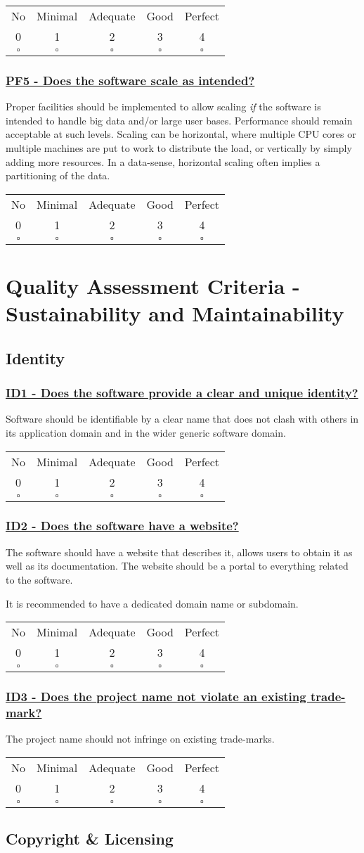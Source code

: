 \documentclass[a4paper,11pt]{article}
\newcommand{\criterion}[2]{\subsubsection*{\underline{#1 - #2}}\label{id:#1}}
\newcommand\CheckTable{%
  \begin{tabular}{ccccc}
    No & Minimal & Adequate & Good & Perfect \\
    0 & 1 & 2 & 3 & 4 \\
    \hline
    $\square$ & $\square$ & $\square$ & $\square$ & $\square$ \\
  \end{tabular}%
}
\begin{document}
\CheckTable

\newcommand{\pfFiveID}{PF5}
\newcommand{\pfFiveText}{Does the software scale as intended?}
\criterion{\pfFiveID}{\pfFiveText}

Proper facilities should be implemented to allow scaling \emph{if} the software is
intended to handle big data and/or large user bases. Performance should remain
acceptable at such levels.  Scaling can be horizontal, where multiple CPU cores
or multiple machines are put to work to distribute the load, or vertically by
simply adding more resources. In a data-sense, horizontal scaling often implies
a partitioning of the data.

\CheckTable

\section{Quality Assessment Criteria - Sustainability and Maintainability}\label{sec:sustAndMaint}

\subsection{Identity}\label{sec:ide}

\newcommand{\idOneID}{ID1}
\newcommand{\idOneText}{Does the software provide a clear and unique identity?}
\criterion{\idOneID}{\idOneText}

Software should be identifiable by a clear name that does not clash with others
in its application domain and in the wider generic software domain. 

\CheckTable

\newcommand{\idTwoID}{ID2}
\newcommand{\idTwoText}{Does the software have a website?}
\criterion{\idTwoID}{\idTwoText}

The software should have a website that describes it, allows users to obtain
it as well as its documentation. The website should be a portal to everything
related to the software.

It is recommended to have a dedicated domain name or subdomain.

\CheckTable

\newcommand{\idThreeID}{ID3}
\newcommand{\idThreeText}{Does the project name not violate an existing trade-mark?}
\criterion{\idThreeID}{\idThreeText}

The project name should not infringe on existing trade-marks.

\CheckTable

\subsection{Copyright \& Licensing}\label{sec:cop}
\end{document}
